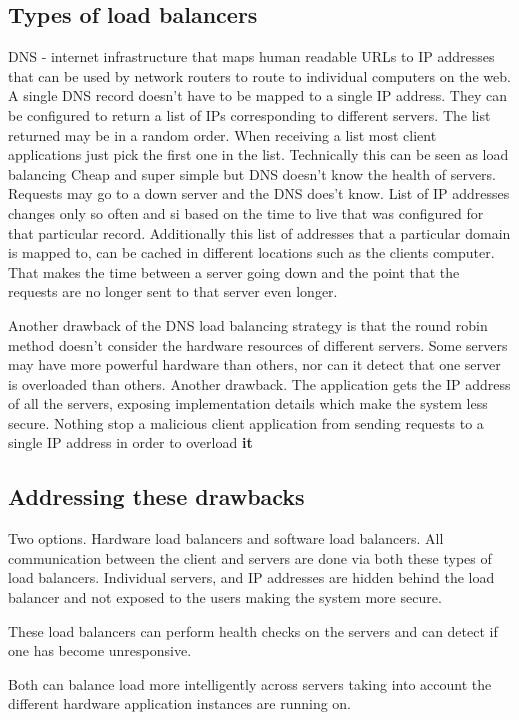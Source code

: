 \subsection{Types of load balancers}
DNS - internet infrastructure that maps human readable URLs to IP addresses that can be used by network routers to route to individual computers on the web.
A single DNS record doesn't have to be mapped to a single IP address.
They can be configured to return a list of IPs corresponding to different servers.
The list returned may be in a random order.
When receiving a list most client applications just pick the first one in the list.
Technically this can be seen as load balancing
Cheap and super simple but DNS doesn't know the health of servers.
Requests may go to a down server and the DNS does't know.
List of IP addresses changes only so often and si based on the time to live that was configured for that particular record.
Additionally this list of addresses that a particular domain is mapped to, can be cached in different locations such as the clients computer.
That makes the time between a server going down and the point that the requests are no longer sent to that server even longer.

Another drawback of the DNS load balancing strategy is that the round robin method doesn't consider the hardware resources of different servers.
Some servers may have more powerful hardware than others, nor can it detect that one server is overloaded than others.
Another drawback.
The application gets the IP address of all the servers, exposing implementation details which make the system less secure.
Nothing stop a malicious client application from sending requests to a single IP address in order to overload \textbf{it}

\subsection{Addressing these drawbacks}
Two options.
Hardware load balancers and software load balancers.
All communication between the client and servers are done via both these types of load balancers.
Individual servers, and IP addresses are hidden behind the load balancer and not exposed to the users making the system more secure.

These load balancers can perform health checks on the servers and can detect if one has become unresponsive.

Both can balance load more intelligently across servers taking into account the different hardware application instances are running on.

